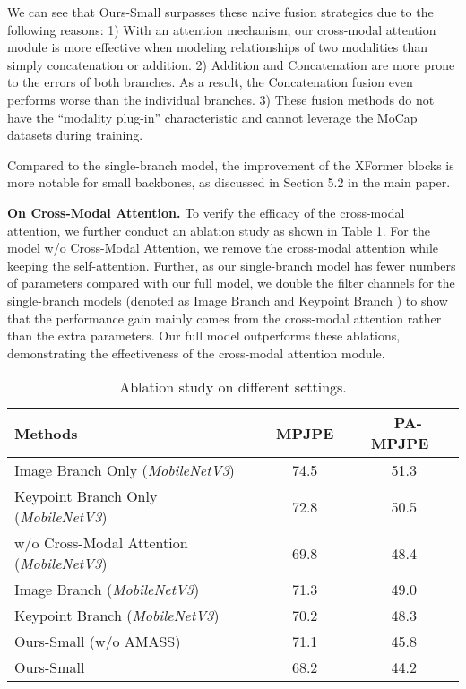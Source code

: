 \documentclass{article}
\newcommand\mypara[1]{\noindent\textbf{#1}}
\begin{document}
We can see that Ours-Small surpasses these naive fusion strategies due to the following reasons:
1) With an attention mechanism, our cross-modal attention module is more effective when modeling relationships of two modalities than simply concatenation or addition. 
2) Addition and Concatenation are more prone to the errors of both branches. As a result, the Concatenation fusion even performs worse than the individual branches.
3) These fusion methods do not have the ``modality plug-in'' characteristic and cannot leverage the MoCap datasets during training.

Compared to the single-branch model, the improvement of the XFormer blocks is more notable for small backbones, as discussed in Section 5.2 in the main paper.


\mypara{On Cross-Modal Attention.}
To verify the efficacy of the cross-modal attention, we further conduct an ablation study as shown in Table \ref{tbl:supp_ablation_cma}. 
For the model w/o Cross-Modal Attention, we remove the cross-modal attention while keeping the self-attention. Further, as our single-branch model has fewer numbers of parameters compared with our full model, we double the filter channels for the single-branch models (denoted as Image Branch  and Keypoint Branch ) to show that the performance gain mainly comes from the cross-modal attention rather than the extra parameters. Our full model outperforms these ablations, demonstrating the effectiveness of the cross-modal attention module.

\begin{table}[h]
\small
\renewcommand{\tabcolsep}{1pt}
\centering
{
\begin{tabular}{lcc}
\toprule
Methods         & ~MPJPE~ &  ~PA-MPJPE~ \\ 
\midrule
Image Branch Only (\textit{MobileNetV3})     &   74.5      & 51.3     \\
Keypoint Branch Only (\textit{MobileNetV3})   &   72.8      & 50.5     \\  
w/o Cross-Modal Attention  (\textit{MobileNetV3}) &   69.8   &  48.4  \\
Image Branch   (\textit{MobileNetV3})      &   71.3   &  49.0  \\
Keypoint Branch   (\textit{MobileNetV3})    &   70.2   &  48.3  \\
Ours-Small (w/o AMASS)  &   71.1    & 45.8   \\
Ours-Small  &   68.2    & 44.2   \\
\bottomrule
\end{tabular}
}
\caption{
Ablation study on different settings.
}
\label{tbl:supp_ablation_cma}
\end{table}
\end{document}
